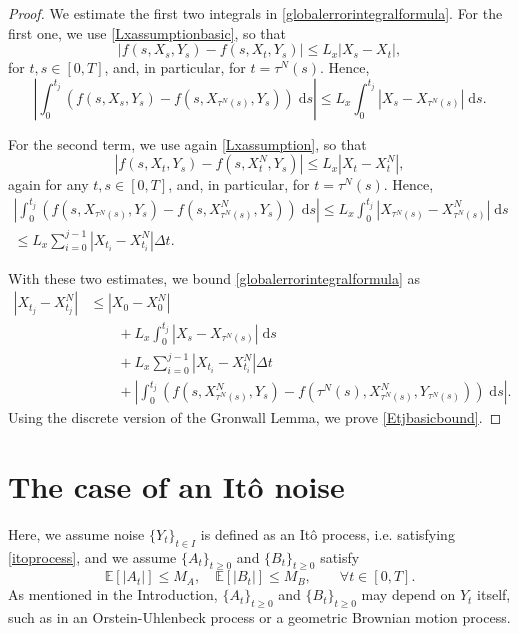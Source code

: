 \documentclass[reqno,12pt]{amsart}
\theoremstyle{plain}%
\theoremstyle{definition}
\begin{document}
\begin{proof}
    We estimate the first two integrals in \eqref{globalerrorintegralformula}. For the first one, we use \eqref{Lxassumptionbasic}, so that
    $$
        |f(s, X_s, Y_s) - f(s, X_t, Y_s)| \leq L_x |X_s - X_t|,
    $$
    for $t, s \in [0, T]$, and, in particular, for $t = \tau^N(s)$. Hence,
    $$
        \left|\int_0^{t_j} \left( f(s, X_s, Y_s) - f(s, X_{\tau^N(s)}, Y_s) \right)\;\mathrm{d}s \right| \leq L_x \int_0^{t_j} |X_s - X_{\tau^N(s)}| \;\mathrm{d}s.
    $$
    
    For the second term, we use again \eqref{Lxassumption}, so that
    $$
        |f(s, X_t, Y_s) - f(s, X_t^N, Y_s)| \leq L_x |X_t - X_t^N|,
    $$
    again for any $t, s \in [0, T]$, and, in particular, for $t = \tau^N(s)$. Hence,
    \begin{multline*}
        \left|\int_0^{t_j} \left( f(s, X_{\tau^N(s)}, Y_s) - f(s, X_{\tau^N(s)}^N, Y_s) \right)\;\mathrm{d}s \right| \leq L_x \int_0^{t_j} |X_{\tau^N(s)} - X_{\tau^N(s)}^N| \;\mathrm{d}s \\
        \leq L_x\sum_{i=0}^{j-1} |X_{t_i} - X_{t_i}^N|\Delta t.
    \end{multline*}
    
    With these two estimates, we bound \eqref{globalerrorintegralformula} as
    \begin{align*}
        |X_{t_j} - X_{t_j}^N| & \leq |X_0 - X_0^N| \\
        & \qquad + L_x \int_0^{t_j} |X_s - X_{\tau^N(s)}| \;\mathrm{d}s  \\ 
        & \qquad + L_x\sum_{i=0}^{j-1} |X_{t_i} - X_{t_i}^N|\Delta t \\
        & \qquad + \left|\int_0^{t_j} \left( f(s, X_{\tau^N(s)}^N, Y_s) - f(\tau^N(s), X_{\tau^N(s)}^N, Y_{\tau^N(s)}) \right)\;\mathrm{d}s\right|.
    \end{align*}
    Using the discrete version of the Gronwall Lemma, we prove \eqref{Etjbasicbound}.
\end{proof}

\section{The case of an It\^o noise}

Here, we assume noise $\{Y_t\}_{t\in I}$ is defined as an It\^o process, i.e. satisfying \eqref{itoprocess}, and we assume $\{A_t\}_{t \geq 0}$ and $\{B_t\}_{t \geq 0}$ satisfy
\begin{equation}
    \label{EAtEBtbound}
    \mathbb{E}[|A_t|] \leq M_A, \quad \mathbb{E}[|B_t|] \leq M_B, \qquad \forall t \in [0, T].
\end{equation}
As mentioned in the Introduction, $\{A_t\}_{t \geq 0}$ and $\{B_t\}_{t \geq 0}$ may depend on $Y_t$ itself, such as in an Orstein-Uhlenbeck process or a geometric Brownian motion process.
\end{document}
